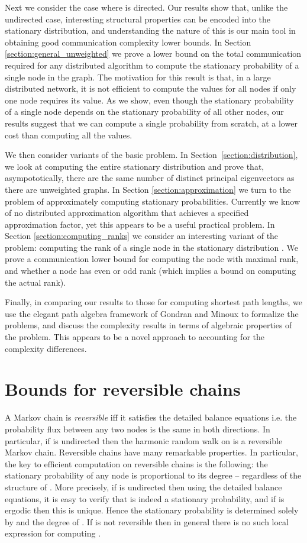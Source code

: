 \documentclass[twocolumn]{article}
\begin{document}
Next we consider the case where  is directed. Our results show that,
unlike the undirected case, interesting structural properties can be encoded into the stationary distribution, and
understanding the nature of this is our main tool in obtaining
good communication complexity lower bounds. In Section
\ref{section:general_unweighted} we prove a lower bound on the total
communication required for any distributed algorithm to compute the
stationary probability of a single node in the graph. The motivation for this result is that, in a large distributed network, it is not efficient to compute the values for all nodes if only one node requires its value. As we show, even though the stationary probability of a single node depends on the stationary probability of all other nodes, our results suggest that we can compute a single probability from scratch, at a lower cost than computing all the values.

We then consider variants of the basic problem. In
Section~\ref{section:distribution}, we look at computing
the entire stationary distribution and prove that, asympototically, there are the same number of distinct principal eigenvectors as there are unweighted graphs. In Section \ref{section:approximation} we turn to the problem of
approximately computing stationary probabilities. Currently we know of
no distributed approximation algorithm that achieves a specified
approximation factor, yet this appears to be a useful practical problem.
In Section \ref{section:computing_ranks} we consider an interesting
variant of the problem: computing the rank of a single node in the
stationary distribution . We prove a communication lower bound for
computing the node with maximal rank, and whether a node has even or odd
rank (which implies a bound on computing the actual rank).

Finally, in comparing our results to those for computing shortest path lengths, we use the elegant path algebra framework of Gondran and Minoux \cite{817} to formalize the problems, and discuss the complexity results in terms of algebraic properties of the problem. This appears to be a novel approach to accounting for the complexity differences.

\section{Bounds for reversible chains}
\label{section:reversible_chains}
A Markov chain is \emph{reversible} iff it satisfies the detailed
balance
equations  i.e. the probability flux between any two nodes
is the same in both directions. In particular, if  is undirected then
the harmonic random walk on  is a reversible Markov chain. Reversible chains have many remarkable properties. In particular, the key to efficient computation on reversible chains is the following: the stationary probability of any node is proportional to its degree -- regardless of the structure of . More precisely, if  is undirected then using the detailed balance equations, it is easy to verify that  is indeed a stationary probability, and if  is ergodic then this is unique. Hence the stationary probability  is determined solely by  and the degree of . If  is not reversible then in general there is no such local expression for computing .
\end{document}
